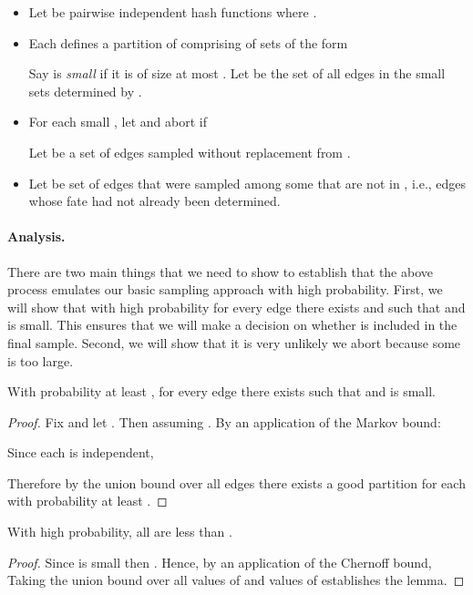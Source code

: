 \documentclass[11pt]{article}
\begin{document}
\begin{itemize}
\item Let  be pairwise independent hash functions where .
\item  Each  defines a partition of  comprising of sets of the form
  
Say  is \emph{small} if it is of size at most . Let  be the set of all edges in the small sets determined by .
\item For each small , let 
 and abort if 

Let  be a set of  edges sampled without replacement from .

\item Let  be set of edges that were sampled among some  that are not in , i.e., edges whose fate had not already been determined.

\end{itemize}

\paragraph{Analysis.} There are two main things that we need to show to establish that the above process emulates our basic sampling approach with high probability. First, we will show that with high probability for every edge  there exists  and  such that  and  is small. This ensures that we will make a decision on whether  is included in the final sample. Second, we will show that it is very unlikely we abort because some  is too large. 


\begin{lemma}
With probability at least , for every edge  there exists  such that  and  is small. \end{lemma}
\begin{proof}
Fix  and let . Then  assuming . By an application of the Markov bound:
 
Since each  is independent,
  
Therefore by the union bound over all  edges there exists a good partition for each  with probability at least .
\end{proof}


\begin{lemma}
With high probability, all  are less than .
\end{lemma}
\begin{proof}
Since  is small then . Hence, by an application of the Chernoff bound, 
 Taking the union bound over all  values of  and  values of  establishes the lemma. 
\end{proof}
\end{document}
